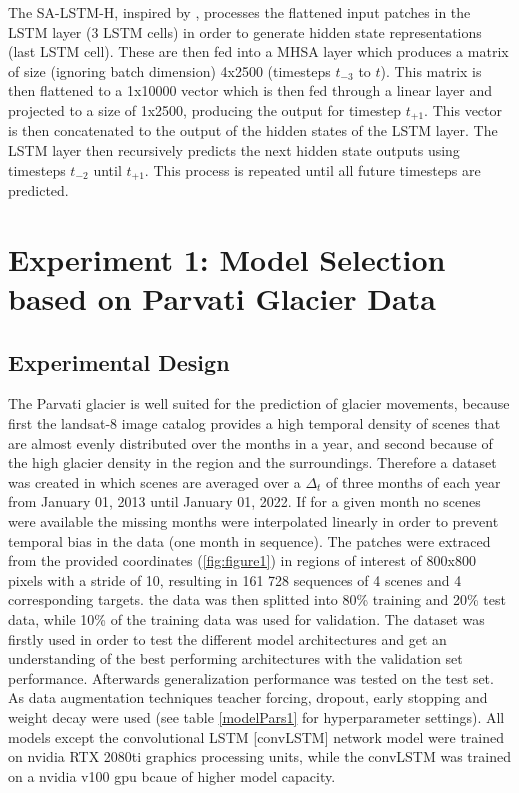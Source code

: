\documentclass[12pt]{article}
\begin{document}
The SA-LSTM-H, inspired by \citet{mu2023icetft}, processes the flattened input patches in the LSTM layer (3 LSTM cells) in order to generate hidden state representations (last LSTM cell). These are then fed into a MHSA layer which produces a matrix of size (ignoring batch dimension) 4x2500 (timesteps $t_{-3}$ to $t$). This matrix is then flattened to a 1x10000 vector which is then fed through a linear layer and projected to a size of 1x2500, producing the output for timestep $t_{+1}$. This vector is then concatenated to the output of the hidden states of the LSTM layer. The LSTM layer then recursively predicts the next hidden state outputs using timesteps $t_{-2}$ until $t_{+1}$. This process is repeated until all future timesteps are predicted.

\section{Experiment 1: Model Selection based on Parvati Glacier Data}
\subsection{Experimental Design}
The Parvati glacier is well suited for the prediction of glacier movements, because first the landsat-8 image catalog provides a high temporal density of scenes that are almost evenly distributed over the months in a year, and second because of the high glacier density in the region and the surroundings. Therefore a dataset was created in which scenes are averaged over a $\Delta_t$ of three months of each year from January 01, 2013 until January 01, 2022. If for a given month no scenes were available the missing months were interpolated linearly in order to prevent temporal bias in the data (one month in sequence). The patches were extraced from the provided coordinates (\ref{fig:figure1}) in regions of interest of 800x800 pixels with a stride of 10, resulting in 161 728 sequences of 4 scenes and 4 corresponding targets. the data was then splitted into 80\% training and 20\% test data, while 10\% of the training data was used for validation. The dataset was firstly used in order to test the different model architectures and get an understanding of the best performing architectures with the validation set performance. Afterwards generalization performance was tested on the test set. As data augmentation techniques teacher forcing, dropout, early stopping and weight decay were used (see table \ref{modelPars1} for hyperparameter settings). All models except the convolutional LSTM [convLSTM] network model were trained on nvidia RTX 2080ti graphics processing units, while the convLSTM was trained on a nvidia v100 gpu bcaue of higher model capacity.
\end{document}
